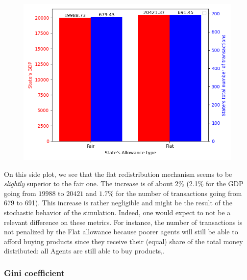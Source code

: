 {{{{{{{{{{{{        \begin{figure}
            \includegraphics[width=\linewidth]{img/exp/8_1.png}
        \end{figure} 
        { On this side plot, we see that the flat redistribution mechanism seems to be \emph{slightly} superior to the fair one. The increase is of about $2\%$ (2.1\% for the GDP going from $19988$ to $20421$ and $1.7\%$ for the number of transactions going from 679 to 691). This increase is rather negligible and might be the result of the stochastic behavior of the simulation. Indeed, one would expect to not be a relevant difference on these metrics. For instance, the number of transactions is not penalized by the Flat allowance because poorer agents will still be able to afford buying products since they receive their (equal) share of the total money distributed: all Agents are still able to buy products,.
        \par

        \subsubsection{Gini coefficient}

}}}}}}}}}}}}}
